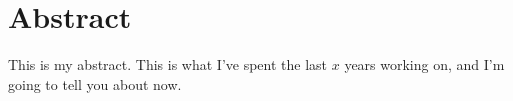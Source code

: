 \chapter{Abstract}

This is my abstract.  This is what I've spent the last $x$ years working on,
and I'm going to tell you about now.
